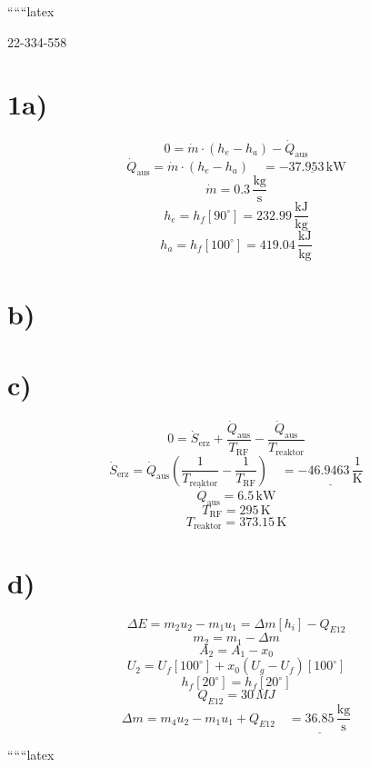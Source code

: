 
``````latex

22-334-558

\section*{1a)}
\[
0 = \dot{m} \cdot (h_e - h_a) - \dot{Q}_{\text{aus}}
\]
\[
\dot{Q}_{\text{aus}} = \dot{m} \cdot (h_e - h_a) \quad = \underline{-37.953 \, \text{kW}}
\]
\[
\dot{m} = 0.3 \, \frac{\text{kg}}{\text{s}}
\]
\[
h_e = h_f \left[ 90^\circ \right] = 232.99 \, \frac{\text{kJ}}{\text{kg}}
\]
\[
h_a = h_f \left[ 100^\circ \right] = 419.04 \, \frac{\text{kJ}}{\text{kg}}
\]

\section*{b)}

\section*{c)}
\[
0 = \dot{S}_{\text{erz}} + \frac{\dot{Q}_{\text{aus}}}{T_{\text{RF}}} - \frac{\dot{Q}_{\text{aus}}}{T_{\text{reaktor}}}
\]
\[
\dot{S}_{\text{erz}} = \dot{Q}_{\text{aus}} \left( \frac{1}{T_{\text{reaktor}}} - \frac{1}{T_{\text{RF}}} \right) \quad = \underline{-46.9463 \, \frac{1}{\text{K}}}
\]
\[
\dot{Q}_{\text{aus}} = 6.5 \, \text{kW}
\]
\[
T_{\text{RF}} = 295 \, \text{K}
\]
\[
T_{\text{reaktor}} = 373.15 \, \text{K}
\]

\section*{d)}
\[
\Delta E = m_2 u_2 - m_1 u_1 = \Delta m \left[ h_i \right] - Q_{E12}
\]
\[
m_2 = m_1 - \Delta m
\]
\[
A_2 = A_1 - x_0
\]
\[
U_2 = U_f \left[ 100^\circ \right] + x_0 \left( U_g - U_f \right) \left[ 100^\circ \right]
\]
\[
h_f \left[ 20^\circ \right] = h_f \left[ 20^\circ \right]
\]
\[
Q_{E12} = 30 \, MJ
\]
\[
\Delta m = m_4 u_2 - m_1 u_1 + Q_{E12} \quad \underline{= 36.85 \, \frac{\text{kg}}{\text{s}}}
\]

``````latex


